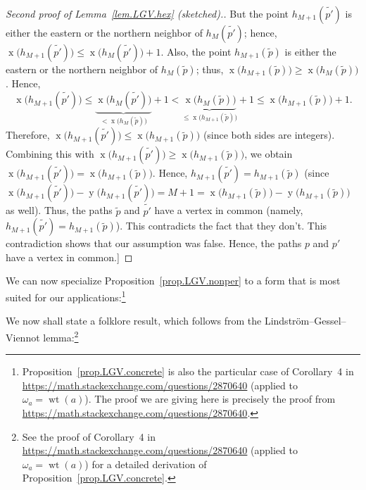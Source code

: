 \documentclass[reqno]{amsart}
\newcommand{\0}{\phantom{c}}
\DeclareMathOperator{\wt}{wt} %
\DeclareMathOperator{\xcoord}{x} %
\DeclareMathOperator{\ycoord}{y} %
\newenvironment{verlonglong}{}{}
\theoremstyle{plain}
\theoremstyle{definition}
\numberwithin{equation}{section}
\begin{document}
\begin{verlonglong}
\begin{proof}[Second proof of Lemma~\ref{lem.LGV.hex} (sketched).]
But the point $h_{M+1}(\widetilde{p'})$ is either the eastern or the northern neighbor of $h_{M}(\widetilde{p'})$; hence, $\xcoord\bigl( h_{M+1}(\widetilde{p'}) \bigr) \leq \xcoord\bigl( h_{M}(\widetilde{p'}) \bigr) + 1$.
Also, the point $h_{M+1}(\widetilde{p})$ is either the eastern or the northern neighbor of $h_{M}(\widetilde{p})$; thus, $\xcoord\bigl( h_{M+1}(\widetilde{p}) \bigr) \geq \xcoord\bigl( h_{M}(\widetilde{p}) \bigr)$.
Hence,
\[
\xcoord\bigl( h_{M+1}(\widetilde{p'}) \bigr) \leq \underbrace{\xcoord\bigl( h_{M}(\widetilde{p'}) \bigr)}_{<\xcoord\bigl( h_{M}(\widetilde{p}) \bigr)} + 1 < \underbrace{\xcoord\bigl( h_{M}(\widetilde{p}) \bigr)}_{\leq\xcoord\bigl( h_{M+1}(\widetilde{p}) \bigr)} + 1 \leq \xcoord\bigl( h_{M+1}(\widetilde{p}) \bigr) + 1.
\]
Therefore, $\xcoord\bigl( h_{M+1}(\widetilde{p'}) \bigr) \leq \xcoord\bigl( h_{M+1}(\widetilde{p}) \bigr)$ (since both sides are integers).
Combining this with $\xcoord\bigl( h_{M+1}(\widetilde{p'}) \bigr) \geq \xcoord\bigl( h_{M+1}(\widetilde{p}) \bigr)$, we obtain $\xcoord\bigl( h_{M+1}(\widetilde{p'}) \bigr) = \xcoord\bigl( h_{M+1}(\widetilde{p}) \bigr)$.
Hence, $h_{M+1}(\widetilde{p'}) = h_{M+1}(\widetilde{p})$ (since $\xcoord\bigl( h_{M+1}(\widetilde{p'}) \bigr) -\ycoord\bigl( h_{M+1}(\widetilde{p'}) \bigr) = M + 1 = \xcoord\bigl( h_{M+1}(\widetilde{p}) \bigr) - \ycoord( h_{M+1}(\widetilde{p}) \bigr)$ as well).
Thus, the paths $\widetilde{p}$ and $\widetilde{p'}$ have a vertex in common (namely, $h_{M+1}(\widetilde{p'}) = h_{M+1}(\widetilde{p})$).
This contradicts the fact that they don't.
This contradiction shows that our assumption was false.
Hence, the paths $p$ and $p'$ have a vertex in common.]
\end{proof}

We can now specialize Proposition~\ref{prop.LGV.nonper} to a form that is most
suited for our applications:\footnote{%
Proposition~\ref{prop.LGV.concrete} is also the particular case of Corollary~4 in \url{https://math.stackexchange.com/questions/2870640} (applied to $\omega_{a} = \wt(a)$).
The proof we are giving here is precisely the proof from \url{https://math.stackexchange.com/questions/2870640}.}
\end{verlonglong}

We now shall state a folklore result, which follows from the Lindstr\"om--Gessel--Viennot lemma:\footnote{%
See the proof of Corollary~4 in \url{https://math.stackexchange.com/questions/2870640} (applied to $\omega_{a} = \wt(a)$) for a detailed derivation of Proposition~\ref{prop.LGV.concrete}.}
\end{document}
